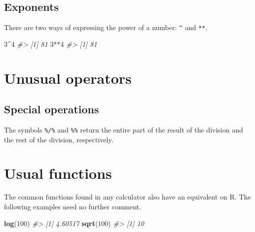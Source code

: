 \documentclass[]{book}
\newenvironment{Shaded}{}{}
\newcommand{\CommentTok}[1]{\textcolor[rgb]{0.38,0.63,0.69}{\textit{#1}}}
\newcommand{\DecValTok}[1]{\textcolor[rgb]{0.25,0.63,0.44}{#1}}
\newcommand{\KeywordTok}[1]{\textcolor[rgb]{0.00,0.44,0.13}{\textbf{#1}}}
\newcommand{\NormalTok}[1]{#1}
\newcommand{\OperatorTok}[1]{\textcolor[rgb]{0.40,0.40,0.40}{#1}}
\theoremstyle{definition}
\theoremstyle{definition}
\theoremstyle{definition}
\theoremstyle{remark}
\begin{document}
\hypertarget{exponents}{%
\subsection{Exponents}\label{exponents}}

There are two ways of expressing the power of a number: \texttt{\^{}}
and \texttt{**}.

\begin{Shaded}
\begin{Highlighting}[]
\DecValTok{3}\OperatorTok{^}\DecValTok{4}
\CommentTok{#> [1] 81}
\DecValTok{3}\OperatorTok{**}\DecValTok{4}
\CommentTok{#> [1] 81}
\end{Highlighting}
\end{Shaded}

\hypertarget{unusual-operators}{%
\section{Unusual operators}\label{unusual-operators}}

\hypertarget{special-operations}{%
\subsection{Special operations}\label{special-operations}}

The symbols \texttt{\%/\%} and \texttt{\%\%} return the entire part of
the result of the division and the rest of the division, respectively.

\begin{Shaded}
\end{Shaded}

\hypertarget{usual-functions}{%
\section{Usual functions}\label{usual-functions}}

The common functions found in any calculator also have an equivalent on
R. The following examples need no further comment.

\begin{Shaded}
\begin{Highlighting}[]
\KeywordTok{log}\NormalTok{(}\DecValTok{100}\NormalTok{)}
\CommentTok{#> [1] 4.60517}
\KeywordTok{sqrt}\NormalTok{(}\DecValTok{100}\NormalTok{)}
\CommentTok{#> [1] 10}
\end{Highlighting}
\end{Shaded}
\end{document}
